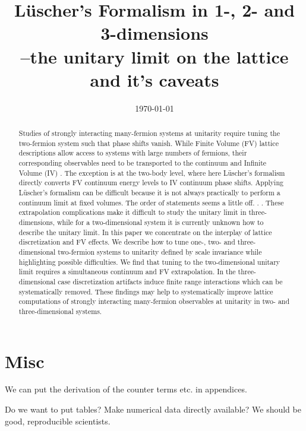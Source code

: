 \documentclass[aps,superscriptaddress,tightenlines,nofootinbib,floatfix,longbibliography,notitlepage]{revtex4-1}
\begin{document}
\title{L\"{u}scher's Formalism in 1-, 2- and 3-dimensions\\--the unitary limit on the lattice and it's caveats}





\date{\today}

\begin{abstract}
Studies of strongly interacting many-fermion systems at unitarity require tuning the two-fermion system such that phase shifts vanish.
While Finite Volume (FV) lattice descriptions allow access to systems with large numbers of fermions, their corresponding observables need to be transported to the continuum and Infinite Volume (IV) .  The exception is at the two-body level, where here L\"{u}scher's formalism directly converts FV continuum energy levels to IV continuum phase shifts.
Applying L\"{u}scher's formalism can be difficult because it is not always practically to perform a continuum limit at fixed volumes. {\color{red} The order of statements seems a little off. . .}
These extrapolation complications make it difficult to study the unitary limit in three-dimensions, while for a two-dimensional system it is currently unknown how to describe the unitary limit.
In this paper we concentrate on the interplay of lattice discretization and FV effects.
We describe how to tune one-, two- and three-dimensional two-fermion systems to unitarity defined by scale invariance while highlighting possible difficulties.
We find that tuning to the two-dimensional unitary limit requires a simultaneous continuum and FV extrapolation.
In the three-dimensional case discretization artifacts induce finite range interactions which can be systematically removed.
These findings may help to systematically improve lattice computations of strongly interacting many-fermion observables at unitarity in two- and three-dimensional systems.
\end{abstract}

\maketitle




%






\appendix
\section{Misc}

We can put the derivation of the counter terms etc. in appendices.

Do we want to put tables?  Make numerical data directly available?  We should be good, reproducible scientists.









\end{document}
